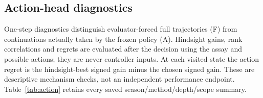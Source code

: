 \documentclass[10pt,a4paper]{article}
\begin{document}
\subsection{Action-head diagnostics}
One-step diagnostics distinguish evaluator-forced full trajectories (F) from continuations actually taken by the frozen policy (A). Hindsight gains, rank correlations and regrets are evaluated after the decision using the assay and possible actions; they are never controller inputs. At each visited state the action regret is the hindsight-best signed gain minus the chosen signed gain. These are descriptive mechanism checks, not an independent performance endpoint. Table~\ref{tab:action} retains every saved season/method/depth/scope summary.

\begingroup\footnotesize
\setlength{\tabcolsep}{3.5pt}
\renewcommand{\arraystretch}{1.10}
\end{document}
